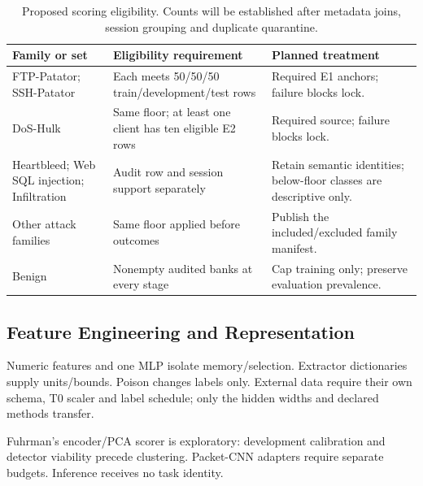 \documentclass[10pt,a4paper]{article}
\begin{document}
\begin{table}[htbp]
\centering\footnotesize
\caption{Proposed scoring eligibility. Counts will be established after metadata joins, session grouping and duplicate quarantine.}
\label{tab:support}
\begin{tabularx}{\linewidth}{L{3.0cm}L{2.9cm}Y}
\toprule
Family or set & Eligibility requirement & Planned treatment\\
\midrule
FTP-Patator; SSH-Patator & Each meets 50/50/50 train/development/test rows & Required E1 anchors; failure blocks lock.\\
DoS-Hulk & Same floor; at least one client has ten eligible E2 rows & Required source; failure blocks lock.\\
Heartbleed; Web SQL injection; Infiltration & Audit row and session support separately & Retain semantic identities; below-floor classes are descriptive only.\\
Other attack families & Same floor applied before outcomes & Publish the included/excluded family manifest.\\
Benign & Nonempty audited banks at every stage & Cap training only; preserve evaluation prevalence.\\
\bottomrule
\end{tabularx}
\end{table}

\subsection{Feature Engineering and Representation}
Numeric features and one MLP isolate memory/selection. Extractor dictionaries supply units/bounds. Poison changes labels only.
External data require their own schema, T0 scaler and label schedule; only the hidden widths and declared methods transfer.

Fuhrman's encoder/PCA scorer is exploratory: development calibration and detector viability precede clustering. Packet-CNN adapters require separate budgets. Inference receives no task identity.
\end{document}

